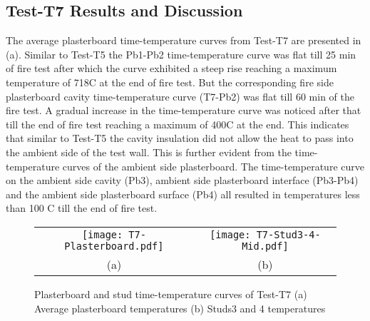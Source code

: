 \subsection{Test-T7 Results and Discussion}

The average plasterboard time-temperature curves from Test-T7 are presented in  (a). Similar to Test-T5 the Pb1-Pb2 time-temperature curve was flat till 25 min of fire test after which the curve exhibited a steep rise reaching a maximum temperature of 718\degree C at the end of fire test. But the corresponding fire side plasterboard cavity time-temperature curve (T7-Pb2) was flat till 60 min of the fire test. A gradual increase in the time-temperature curve was noticed after that till the end of fire test reaching a maximum of 400\degree C at the end. This indicates that similar to Test-T5 the cavity insulation did not allow the heat to pass into the ambient side of the test wall. This is further evident from the time-temperature curves of the ambient side plasterboard. The time-temperature curve on the ambient side cavity (Pb3), ambient side plasterboard interface (Pb3-Pb4) and the ambient side plasterboard surface (Pb4) all resulted in temperatures less than 100 \degree C till the end of fire test.
\begin{figure}[!htbp]
	\centering	
		\begin{tabular}{cc}
			\texttt{[image: T7-Plasterboard.pdf]} & \texttt{[image: T7-Stud3-4-Mid.pdf]} \\
			(a) & (b) \\
			\end{tabular}
		\caption{Plasterboard and stud time-temperature curves of Test-T7 (a) Average plasterboard temperatures (b) Studs3 and 4 temperatures}
		\label{fig:T7-time-temperature}
\end{figure}

